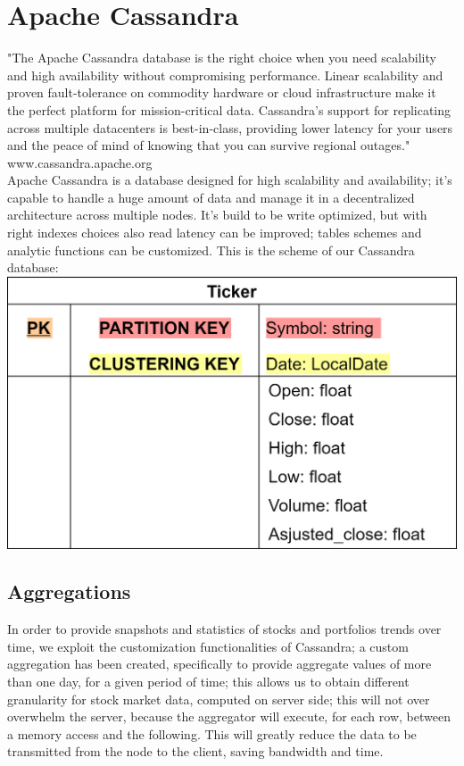\section{Apache Cassandra}
"The Apache Cassandra database is the right choice when you need scalability and high 
availability without compromising performance. Linear scalability and proven fault-tolerance 
on commodity hardware or cloud infrastructure make it the perfect platform for mission-critical 
data. Cassandra's support for replicating across multiple datacenters is best-in-class, 
providing lower latency for your users and the peace of mind of knowing that you can survive
regional outages." www.cassandra.apache.org\\
Apache Cassandra is a database designed for high scalability and availability; it's 
capable to handle a huge amount of data and manage it in a decentralized architecture
across multiple nodes. It's build to be write optimized, but with right indexes choices
also read latency can be improved; tables schemes and analytic functions can be customized.
This is the scheme of our Cassandra database:\\
\includegraphics[scale=0.2]{img/cassandraDB_scheme.png}\\

\subsection{Aggregations}
In order to provide snapshots and statistics of stocks and portfolios trends over time,
we exploit the customization functionalities of Cassandra; a custom aggregation has been 
created, specifically to provide aggregate values of more than one day, for a given
period of time; this allows us to obtain different granularity for stock market data,
computed on server side; this will not over overwhelm the server, because the aggregator will
execute, for each row, between a memory access and the following. This will greatly reduce
the data to be transmitted from the node to the client, saving bandwidth and time.  \\

